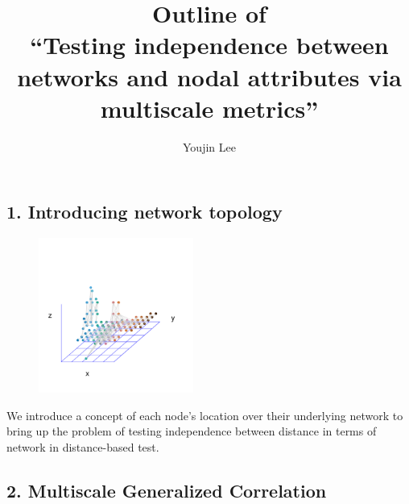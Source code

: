 \documentclass[12pt]{article}
\begin{document}
	
	\title{Outline of \\``Testing independence between networks and nodal attributes via multiscale metrics''}
	
	\author{Youjin Lee}
	
	\maketitle
		
\subsection*{1. Introducing network topology}

\begin{figure}[H]
	\centering
	\includegraphics[width=2in]{../Figure/intro.pdf}	
	\label{fig:intro}
\end{figure}
We introduce a concept of each node's location over their underlying network to bring up the problem of testing independence between distance in terms of network in distance-based test. 
\subsection*{2. Multiscale Generalized Correlation}
\end{document}
